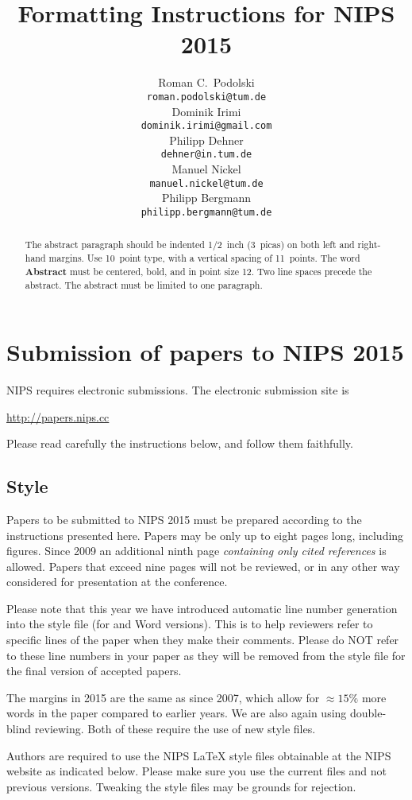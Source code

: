 \documentclass{article} %
\title{Formatting Instructions for NIPS 2015}
\author{
Roman C.~Podolski
\\
\texttt{roman.podolski@tum.de} \\
\And
Dominik Irimi \\
\texttt{dominik.irimi@gmail.com} \\
\AND
Philipp Dehner \\
\texttt{dehner@in.tum.de} \\
\And
Manuel Nickel \\
\texttt{manuel.nickel@tum.de} \\
\And
Philipp Bergmann \\
\texttt{philipp.bergmann@tum.de} \\
}
\begin{document}
\maketitle

\begin{abstract}
The abstract paragraph should be indented 1/2~inch (3~picas) on both left and
right-hand margins. Use 10~point type, with a vertical spacing of 11~points.
The word \textbf{Abstract} must be centered, bold, and in point size 12. Two
line spaces precede the abstract. The abstract must be limited to one
paragraph.
\end{abstract}

\section{Submission of papers to NIPS 2015}

NIPS requires electronic submissions.  The electronic submission site is  
\begin{center}
   \url{http://papers.nips.cc}
\end{center}

Please read carefully the
instructions below, and follow them faithfully.
\subsection{Style}

Papers to be submitted to NIPS 2015 must be prepared according to the
instructions presented here. Papers may be only up to eight pages long,
including figures. Since 2009 an additional ninth page \textit{containing only
cited references} is allowed. Papers that exceed nine pages will not be
reviewed, or in any other way considered for presentation at the conference.

Please note that this year we have introduced automatic line number generation
into the style file (for \LaTeXe and Word versions). This is to help reviewers
refer to specific lines of the paper when they make their comments. Please do
NOT refer to these line numbers in your paper as they will be removed from the
style file for the final version of accepted papers.

The margins in 2015 are the same as since 2007, which allow for $\approx 15\%$
more words in the paper compared to earlier years. We are also again using 
double-blind reviewing. Both of these require the use of new style files.

Authors are required to use the NIPS \LaTeX{} style files obtainable at the
NIPS website as indicated below. Please make sure you use the current files and
not previous versions. Tweaking the style files may be grounds for rejection.
\end{document}
